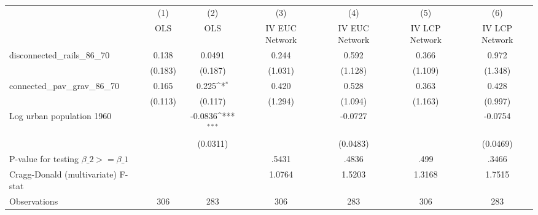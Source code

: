 {
\def\sym#1{\ifmmode^{#1}\else\(^{#1}\)\fi}
\begin{tabular}{l*{6}{c}}
\hline\hline
                &\multicolumn{1}{c}{(1)}&\multicolumn{1}{c}{(2)}&\multicolumn{1}{c}{(3)}&\multicolumn{1}{c}{(4)}&\multicolumn{1}{c}{(5)}&\multicolumn{1}{c}{(6)}\\
                &\multicolumn{1}{c}{OLS}&\multicolumn{1}{c}{OLS}&\multicolumn{1}{c}{IV EUC Network}&\multicolumn{1}{c}{IV EUC Network}&\multicolumn{1}{c}{IV LCP Network}&\multicolumn{1}{c}{IV LCP Network}\\
\hline
disconnected\_rails\_86\_70&    0.138         &   0.0491         &    0.244         &    0.592         &    0.366         &    0.972         \\
                &  (0.183)         &  (0.187)         &  (1.031)         &  (1.128)         &  (1.109)         &  (1.348)         \\
[1em]
connected\_pav\_grav\_86\_70&    0.165         &    0.225\sym{*}  &    0.420         &    0.528         &    0.363         &    0.428         \\
                &  (0.113)         &  (0.117)         &  (1.294)         &  (1.094)         &  (1.163)         &  (0.997)         \\
[1em]
Log urban population 1960&                  &  -0.0836\sym{***}&                  &  -0.0727         &                  &  -0.0754         \\
                &                  & (0.0311)         &                  & (0.0483)         &                  & (0.0469)         \\
\hline
P-value for testing $\beta\_{2} >= \beta\_{1}$&                  &                  &    .5431         &    .4836         &     .499         &    .3466         \\
Cragg-Donald (multivariate) F-stat&                  &                  &   1.0764         &   1.5203         &   1.3168         &   1.7515         \\
Observations    &      306         &      283         &      306         &      283         &      306         &      283         \\
\hline\hline
\end{tabular}
}
